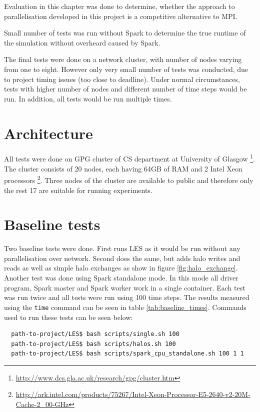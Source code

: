\documentclass{l4proj}
\begin{document}
Evaluation in this chapter was done to determine, whether the approach to parallelisation
developed in this project is a competitive alternative to MPI.

Small number of tests was run without Spark to determine the true runtime of
the simulation without overheard caused by Spark.

The final tests were done on a network cluster, with number of nodes varying from one
to eight. However only very small number of tests was conducted, due to 
project timing issues (too close to deadline). Under normal circumstances,
tests with higher number of nodes and different number of time steps would be run.
In addition, all tests would be run multiple times.

\section{Architecture}

All tests were done on GPG cluster of CS department at University of Glasgow
\footnote{\url{http://www.dcs.gla.ac.uk/research/gpg/cluster.htm}}.
The cluster consists of 20 nodes, each having 64GB of RAM and 2 Intel Xeon processors
\footnote{\url{http://ark.intel.com/products/75267/Intel-Xeon-Processor-E5-2640-v2-20M-Cache-2_00-GHz}}.
Three nodes of the cluster are available to public and therefore only the rest 17 are
suitable for running experiments.

\section{Baseline tests}

Two baseline tests were done. First runs LES as it would be run without any
parallelisation over network. Second does the same, but adds halo writes and reads
as well as simple halo exchanges as show in figure \ref{fig:halo_exchange}.
Another test was done using Spark standalone mode. In this mode all driver 
program, Spark master and Spark worker work in a single container. Each test was run twice and 
all tests were run using 100 time steps. The results measured using the \texttt{time} command
can be seen in table \ref{tab:baseline_times}. Commands used to run these tests can be seen below:
\begin{verbatim}
  path-to-project/LES$ bash scripts/single.sh 100
  path-to-project/LES$ bash scripts/halos.sh 100
  path-to-project/LES$ bash scripts/spark_cpu_standalone.sh 100 1 1
\end{verbatim}
\end{document}
